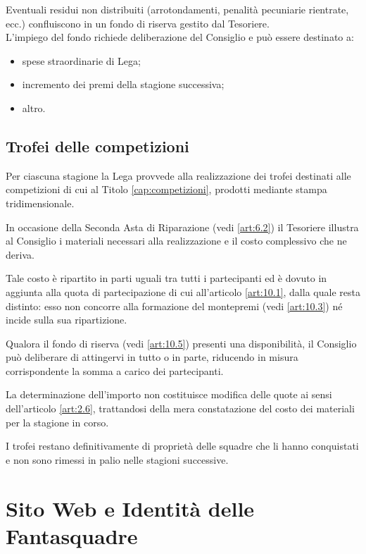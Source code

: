 Eventuali residui non distribuiti (arrotondamenti, penalità pecuniarie rientrate, ecc.) confluiscono in un fondo di riserva gestito dal Tesoriere.\\
L'impiego del fondo richiede deliberazione del Consiglio e può essere destinato a:
\begin{itemize}
    \item spese straordinarie di Lega;
    \item incremento dei premi della stagione successiva;
    \item altro.
\end{itemize}

\section{Trofei delle competizioni}
\label{art:10.6}

Per ciascuna stagione la Lega provvede alla realizzazione dei trofei destinati alle competizioni di cui al Titolo \ref{cap:competizioni}, prodotti mediante stampa tridimensionale.

In occasione della Seconda Asta di Riparazione (vedi \ref{art:6.2}) il Tesoriere illustra al Consiglio i materiali necessari alla realizzazione e il costo complessivo che ne deriva.

Tale costo è ripartito in parti uguali tra tutti i partecipanti ed è dovuto in aggiunta alla quota di partecipazione di cui all'articolo \ref{art:10.1}, dalla quale resta distinto: esso non concorre alla formazione del montepremi (vedi \ref{art:10.3}) né incide sulla sua ripartizione.

Qualora il fondo di riserva (vedi \ref{art:10.5}) presenti una disponibilità, il Consiglio può deliberare di attingervi in tutto o in parte, riducendo in misura corrispondente la somma a carico dei partecipanti.

La determinazione dell'importo non costituisce modifica delle quote ai sensi dell'articolo \ref{art:2.6}, trattandosi della mera constatazione del costo dei materiali per la stagione in corso.

I trofei restano definitivamente di proprietà delle squadre che li hanno conquistati e non sono rimessi in palio nelle stagioni successive.


\chapter{Sito Web e Identità delle Fantasquadre}
\label{cap:sito-identita}

